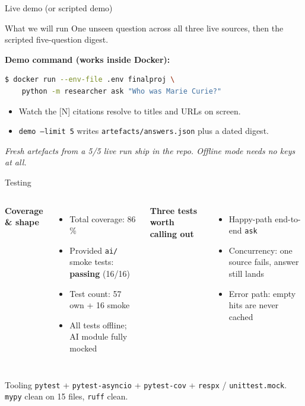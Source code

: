 \documentclass[aspectratio=169,11pt]{beamer}
\begin{document}
\begin{frame}[fragile]{Live demo (or scripted demo)}
  \begin{block}{What we will run}
    One unseen question across all three live sources, then the scripted five-question digest.
  \end{block}

  \vspace{0.4em}
  \textbf{Demo command (works inside Docker):}
  \begin{lstlisting}[style=python,language=bash,numbers=none]
$ docker run --env-file .env finalproj \
    python -m researcher ask "Who was Marie Curie?"
  \end{lstlisting}

  \vspace{0.4em}
  \begin{itemize}
    \item Watch the [N] citations resolve to titles and URLs on screen.
    \item \texttt{demo --limit 5} writes \texttt{artefacts/answers.json} plus a dated digest.
  \end{itemize}

  \vspace{0.3em}
  {\footnotesize\textit{Fresh artefacts from a 5/5 live run ship in the repo. Offline mode needs no keys at all.}}
\end{frame}

\begin{frame}{Testing}
  \begin{columns}[T,onlytextwidth]
  \textbf{Coverage \& shape}
  \begin{itemize}\setlength\itemsep{0.3em}
    \item Total coverage: 86\,\%
    \item Provided \texttt{ai/} smoke tests: \textcolor{ok}{\textbf{passing}} (16/16)
    \item Test count: 57 own + 16 smoke
    \item All tests offline; AI module fully mocked
  \end{itemize}

  \textbf{Three tests worth calling out}
  \begin{itemize}\setlength\itemsep{0.3em}
    \item Happy-path end-to-end \texttt{ask}
    \item Concurrency: one source fails, answer still lands
    \item Error path: empty hits are never cached
  \end{itemize}
  \end{columns}

  \vspace{0.6em}
  \begin{block}{Tooling}
    \texttt{pytest} + \texttt{pytest-asyncio} + \texttt{pytest-cov} + \texttt{respx} / \texttt{unittest.mock}. \texttt{mypy} clean on 15 files, \texttt{ruff} clean.
  \end{block}
\end{frame}
\end{document}

